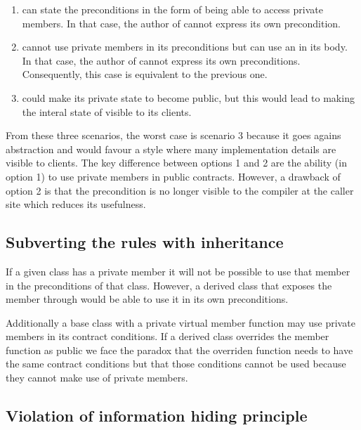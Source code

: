 \begin{enumerate}

\item {} can state the preconditions in the form of
\cppid{[[}\cppid{]]} being able to access private members. In
that case, the author of  cannot express its own
precondition.

\item {} cannot use private members in its
\cppid{[[}\cppid{]]} preconditions but can use an
\cppid{}\cppid{]]} in its body. In that case, the author of
 cannot express its own preconditions. Consequently,
this case is equivalent to the previous one.

\item {} could make its private state to become public, but this would
lead to making the interal state of  visible to its clients.

\end{enumerate}

From these three scenarios, the worst case is scenario 3 because it goes agains
abstraction and would favour a style where many implementation details are
visible to clients. The key difference between options 1 and 2 are the ability
(in option 1) to use private members in public contracts. However, a drawback of
option 2 is that the precondition is no longer visible to the compiler at the
caller site which reduces its usefulness.

\subsection{Subverting the rules with inheritance}

If a given class has a private member it will not be possible to use that member
in the preconditions of that class. However, a derived class that exposes the
member through  would be able to use it in its own preconditions.

Additionally a base class with a private virtual member function may use private
members in its contract conditions. If a derived class overrides the member
function as public we face the paradox that the overriden function needs to have
the same contract conditions but that those conditions cannot be used because
they cannot make use of private members.

\subsection{Violation of information hiding principle}

